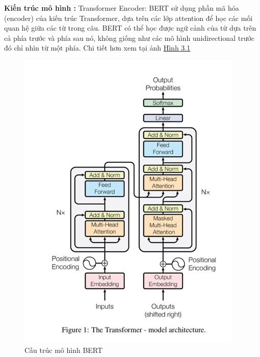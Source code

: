 \textbf{Kiến trúc mô hình :} Transformer Encoder: BERT sử dụng phần mã hóa (encoder) của kiến trúc Transformer, dựa trên các lớp attention để học các mối quan hệ giữa các từ trong câu. BERT có thể học được ngữ cảnh của từ dựa trên cả phía trước và phía sau nó, không giống như các mô hình unidirectional trước đó chỉ nhìn từ một phía. Chi tiết hơn xem tại ảnh \hyperref[fig:image3.1]{Hình 3.1}
\begin{figure}[H] %
        \centering
        \includegraphics[width=0.8\linewidth]{Figures/bert1.jpg}
        \caption{Cấu trúc mô hình BERT}
        \label{fig:image3.1}
    \end{figure}

